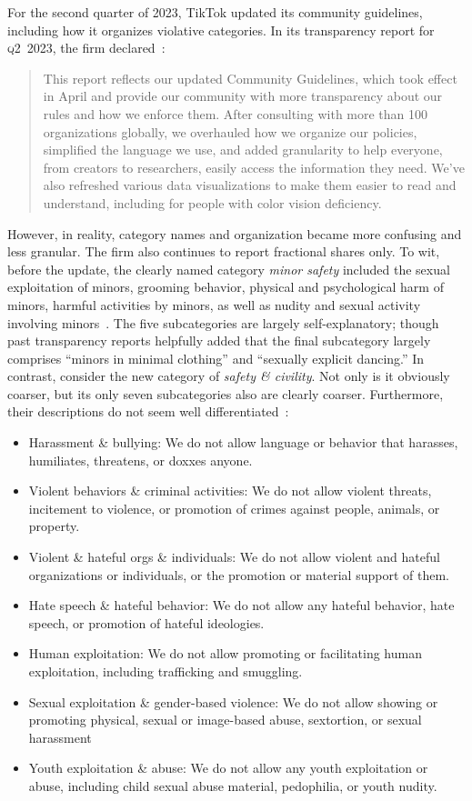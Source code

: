 \documentclass[nonacm,screen]{acmart}
\newcommand\V[1]{\textsc{\MakeLowercase{#1}}}
\begin{document}
For the second quarter of 2023, TikTok updated its community guidelines,
including how it organizes violative categories. In its transparency report for
\V{Q2}~2023, the firm declared~\cite{TikTok2023}:
    \begin{quote}
    This report reflects our updated Community Guidelines, which took effect in
    April and provide our community with more transparency about our rules and
    how we enforce them. After consulting with more than 100 organizations
    globally, we overhauled how we organize our policies, simplified the
    language we use, and added granularity to help everyone, from creators to
    researchers, easily access the information they need. We’ve also refreshed
    various data visualizations to make them easier to read and understand,
    including for people with color vision deficiency.
    \end{quote}
However, in reality, category names and organization became more confusing and
less granular. The firm also continues to report fractional shares only. To wit,
before the update, the clearly named category \emph{minor safety} included the
sexual exploitation of minors, grooming behavior, physical and psychological
harm of minors, harmful activities by minors, as well as nudity and sexual
activity involving minors~\cite{TikTok2023a}. The five subcategories are largely
self-explanatory; though past transparency reports helpfully added that the
final subcategory largely comprises ``minors in minimal clothing'' and
``sexually explicit dancing.'' In contrast, consider the new category of
\emph{safety \& civility}. Not only is it obviously coarser, but its only seven
subcategories also are clearly coarser. Furthermore, their descriptions do not
seem well differentiated~\cite{TikTok2023}:
\begin{itemize}
    \item Harassment \& bullying: We do not allow language or behavior that
    harasses, humiliates, threatens, or doxxes anyone.
    \item Violent behaviors \& criminal activities: We do not allow violent
    threats, incitement to violence, or promotion of crimes against people,
    animals, or property.
    \item Violent \& hateful orgs \& individuals: We do not allow violent and
    hateful organizations or individuals, or the promotion or material support
    of them.
    \item Hate speech \& hateful behavior: We do not allow any hateful behavior,
    hate speech, or promotion of hateful ideologies.
    \item Human exploitation: We do not allow promoting or facilitating human
    exploitation, including trafficking and smuggling.
    \item Sexual exploitation \& gender-based violence: We do not allow showing
    or promoting physical, sexual or image-based abuse, sextortion, or sexual
    harassment
    \item Youth exploitation \& abuse: We do not allow any youth exploitation or
    abuse, including child sexual abuse material, pedophilia, or youth nudity.
\end{itemize}
\end{document}
